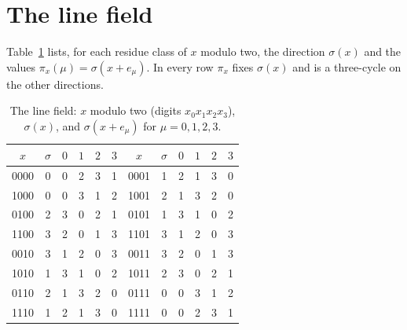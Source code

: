 \section{The line field}\label{app:table}

Table~\ref{tab:sigma} lists, for each residue class of $x$ modulo two, the
direction $\sigma(x)$ and the values $\pi_x(\mu)=\sigma(x+e_\mu)$. In every row
$\pi_x$ fixes $\sigma(x)$ and is a three-cycle on the other directions.

\begin{table}[h]
\caption{The line field: $x$ modulo two (digits $x_0x_1x_2x_3$), $\sigma(x)$, and
$\sigma(x+e_\mu)$ for $\mu=0,1,2,3$.}
\label{tab:sigma}
\begin{tabular}{cccccc|cccccc}
\toprule
$x$&$\sigma$&$0$&$1$&$2$&$3$&$x$&$\sigma$&$0$&$1$&$2$&$3$\\
\midrule
0000 & 0 & 0 & 2 & 3 & 1 & 0001 & 1 & 2 & 1 & 3 & 0 \\
1000 & 0 & 0 & 3 & 1 & 2 & 1001 & 2 & 1 & 3 & 2 & 0 \\
0100 & 2 & 3 & 0 & 2 & 1 & 0101 & 1 & 3 & 1 & 0 & 2 \\
1100 & 3 & 2 & 0 & 1 & 3 & 1101 & 3 & 1 & 2 & 0 & 3 \\
0010 & 3 & 1 & 2 & 0 & 3 & 0011 & 3 & 2 & 0 & 1 & 3 \\
1010 & 1 & 3 & 1 & 0 & 2 & 1011 & 2 & 3 & 0 & 2 & 1 \\
0110 & 2 & 1 & 3 & 2 & 0 & 0111 & 0 & 0 & 3 & 1 & 2 \\
1110 & 1 & 2 & 1 & 3 & 0 & 1111 & 0 & 0 & 2 & 3 & 1 \\
\bottomrule
\end{tabular}
\end{table}

